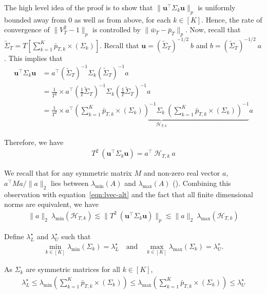 \documentclass[11pt,letterpaper]{article}
\newcommand{\PT}{\tilde{\Sigma}_T}
\newcommand{\lvec}{\textbf{u}}
\theoremstyle{plain}
\theoremstyle{definition}  %
\begin{document}
\noindent The high level idea of the proof is to show that $ \| \lvec^{\top} \Sigma_k \lvec \|_p$ is uniformly bounded away from $0$ as well as from above, for each $k \in [K]$. Hence, the rate of convergence of $ \|V^2_T-1 \|_p$ is controlled by $\| \bar{w}_{T}-\bar{p}_{T}\|_p$. Now, recall that $\PT = T \left[\sum^K_{k=1} \bar{p}_{T,k} \times (\Sigma_k) \right]$. Recall that $\lvec = (\PT)^{-1/2} \ b$ and  $b = (\PT)^{-1/2} \ a$. This implies that
\begin{align*}
   \lvec^{\top} \Sigma_k \lvec 
    &= a^{\top} 
    \left(\PT \right)^{-1} \Sigma_k \left(\PT \right)^{-1} a \\[8pt]
    &=\frac{1}{T^2} \times   a^{\top}\left(\frac{1}{T}\PT \right)^{-1} \Sigma_k \left(\frac{1}{T}\PT \right)^{-1} a \\[8pt]
    & = \frac{1}{T^2} \times   a^{\top} \underbrace{\left(\sum^K_{k=1} \bar{p}_{T,k} \times (\Sigma_k) \right)^{-1} \Sigma_k \ \left(\sum^K_{k=1} \bar{p}_{T,k} \times (\Sigma_k) \right)^{-1}}_{\mathcal{H}_{T,k}} a
\end{align*}


\noindent Therefore, we have
\begin{align}\label{eqn:lvec-alt}
    T^2 \ (\lvec^{\top} \Sigma_k \lvec) = a^\top \ \mathcal{H}_{T,k} \ a  
\end{align}

\noindent We recall that for any symmetric matrix $M$ and non-zero real vector $a$, $a^\top M a/\| a\|_2$ lies between $\lambda_{\min}(A)$ and $\lambda_{\max}(A)$ (\cite{rao2000linear}). Combining this observation with equation~\eqref{eqn:lvec-alt} and the fact that all finite dimensional norms are equivalent, we have
\begin{align}\label{eqn:quad Tlvec-bdd}
   \|a\|_2  \ \lambda_{\min}(\mathcal{H}_{T,k}) \lesssim \| T^2 \ (\lvec^{\top} \Sigma_k \lvec)\|_p \lesssim \|a\|_2  \ \lambda_{\max}(\mathcal{H}_{T,k})
\end{align}

\noindent Define $\lambda^\star_L$ and $\lambda^\star_U$ such that 
\begin{align}\label{defn:laml-lamu}
    \min_{k \in [K]}\lambda_{\min}(\Sigma_k) = \lambda^\star_L \quad \text{and} \quad 
    \max_{k \in [K]}\lambda_{\max}(\Sigma_k) = \lambda^\star_U.
\end{align}

\noindent As $\Sigma_k$ are symmetric matrices for all $k\in[K]$,
\begin{align}\label{eqn:eigen-bdd-Sig}
\lambda^\star_L
\leq 
   \lambda_{\min} \left(\sum^K_{k=1} \bar{p}_{T,k} \times (\Sigma_k) \right) 
    \leq\lambda_{\max} \left(\sum^K_{k=1} \bar{p}_{T,k} \times (\Sigma_k) \right) 
    \leq \lambda^\star_U
\end{align}
\end{document}
